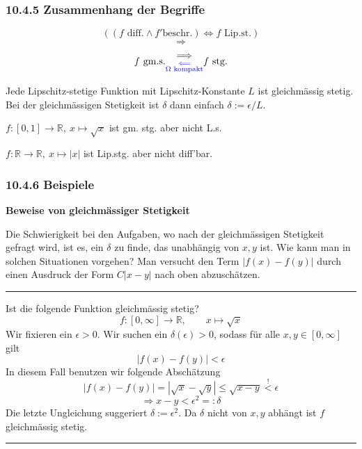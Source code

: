 \documentclass[a4paper,landscape,8pt]{extarticle}
\newcommand{\R}{\mathbb{R}}
\newcommand{\abs}[1]{\left\lvert #1 \right\rvert}
\newcommand{\sep}{\vspace{5pt}\noindent\hrule\vspace{5pt}}
\begin{document}
\begin{multicols*}{4}
\subsubsection{10.4.5 Zusammenhang der Begriffe}

\[
\left((f \text{ diff.} \land f' \text{beschr.}) \Longleftrightarrow f
\text{ Lip.st.}\right)
\]
\[\Longrightarrow\]
\[ f \text{ gm.s.}
\begin{matrix}
\Longrightarrow\\
\color{blue}{\substack{\Longleftarrow\\\Omega \text{ kompakt}}}
\end{matrix}
f \text{ stg.}
\]

Jede Lipschitz-stetige Funktion mit Lipschitz-Konstante $L$ ist gleichmässig
stetig. Bei der gleichmässigen Stetigkeit ist $\delta$ dann einfach
$\delta:=\epsilon/L$.

\Bsp $f\colon[0,1]\to\R, \ x\mapsto \sqrt{x}$ ist gm. stg. aber nicht L.s.

\Bsp $f\colon\R\to\R, \ x\mapsto \abs{x}$ ist Lip.stg. aber nicht
diff'bar.

\subsubsection{10.4.6 Beispiele}

\textbf{Beweise von gleichmässiger Stetigkeit}

\Vorgehen Die Schwierigkeit bei den Aufgaben, wo nach der gleichmässigen
Stetigkeit gefragt wird, ist es, ein $\delta$ zu finde, das unabhängig von $x,y$
ist. Wie kann man in solchen Situationen vorgehen? Man versucht den Term
$\abs{f(x) - f(y)}$ durch einen Ausdruck der Form $C\abs{x-y}$ nach
oben abzuschätzen.

\begin{warmup}
\sep

\Bsp Ist die folgende Funktion gleichmässig stetig?
\[
f\colon[0,\infty]\to\R,\qquad x\mapsto\sqrt{x}
\]
Wir fixieren ein $\epsilon > 0$. Wir suchen ein $\delta(\epsilon)>0$, sodass
für alle $x,y\in [0,\infty]$ gilt
\[
\abs{f(x)-f(y)}<\epsilon
\]
In diesem Fall benutzen wir folgende Abschätzung
\[
\abs{f(x)-f(y)} = \abs{\sqrt{x}-\sqrt{y}} \leq \sqrt{x-y} \stackrel{!}{<}
\epsilon
\]
\[
\Longrightarrow x-y < \epsilon^2 =: \delta
\]
Die letzte Ungleichung suggeriert $\delta:=\epsilon^2$. Da $\delta$ nicht von
$x,y$ abhängt ist $f$ gleichmässig stetig.

\sep


\end{warmup}
\end{multicols*}
\end{document}
